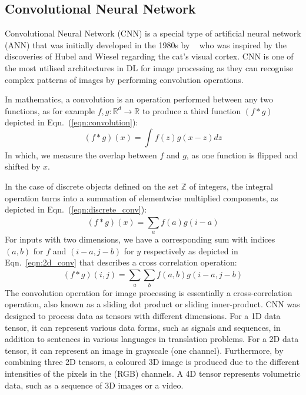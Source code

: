 \subsection{Convolutional Neural Network} 
Convolutional Neural Network (CNN) is a special type of artificial neural network (ANN) that was initially developed in the 1980s by ~\textcite{Fukushima1980} who was inspired by the discoveries of Hubel and Wiesel regarding the cat's visual cortex.
CNN is one of the most utilised architectures in DL for image processing as they can recognise complex patterns of images by performing convolution operations.

In mathematics, a convolution is an operation performed between any two functions, as for example \(f, g:\mathbb{R}^{d} \to \mathbb{R}\) to produce a third function \((f\ast g)\) depicted in Eqn.~(\ref{eqn:convolution}):
\begin{equation}
	(f\ast g)(x) = \int_{}^{} f(z)g(x-z)dz
	\label{eqn:convolution}
\end{equation}
In which, we measure the overlap between \(f\) and \(g\), as one function is flipped and shifted by \(x\).

In the case of discrete objects defined on the set \(\mathbb{Z}\) of integers, the integral operation turns into a summation of elementwise multiplied components, as depicted in Eqn.~(\ref{eqn:discrete_conv}):
\begin{equation}		
	(f\ast g)(x) = \sum_{a}^{} f(a)g(i-a)
	\label{eqn:discrete_conv}
\end{equation}
For inputs with two dimensions, we have a corresponding sum with indices \((a,b)\) for \(f\) and \((i-a, j-b)\) for \(y\) respectively as depicted in Eqn.~\ref{eqn:2d_conv} that describes a cross correlation operation:
\begin{equation}
	(f\ast g)(i,j) = \sum_{a}^{}\sum_{b}^{}f(a,b)g(i-a,j-b)
	\label{eqn:2d_conv}
\end{equation}
The convolution operation for image processing is essentially a cross-correlation opera\-tion, also known as a sliding dot product or sliding inner-product.
CNN was designed to process data as tensors with different dimensions.
For a 1D data tensor, it can represent various data forms, such as signals and sequences, in addition to sentences in various languages in translation problems.
For a 2D data tensor, it can represent an image in grayscale (one channel). Furthermore, by combining three 2D tensors, a coloured 3D image is produced due to the different intensities of the pixels in the (RGB) channels.
A 4D tensor represents volumetric data, such as a sequence of 3D images or a video.

